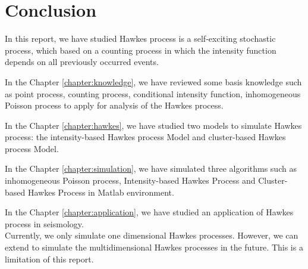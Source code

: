 \chapter{Conclusion}
\label{chapter:conclusion}
In this report, we have studied Hawkes process is a self-exciting stochastic process, which based on a counting process in which the intensity function depends on all previously occurred events. 

In the Chapter \ref{chapter:knowledge}, we have reviewed some basis knowledge such as point process, counting process, conditional intensity function, inhomogeneous Poisson process to apply for analysis of the Hawkes process.

In the Chapter \ref{chapter:hawkes}, we have studied two models to simulate Hawkes process: the intensity-based Hawkes process Model and cluster-based Hawkes process Model.

In the Chapter \ref{chapter:simulation}, we have simulated three algorithms such as inhomogeneous Poisson process, Intensity-based Hawkes Process and Cluster-based Hawkes Process in Matlab\textsuperscript{\textregistered} environment.

In the Chapter \ref{chapter:application}, we have studied an application of Hawkes process in seismology.\\
Currently, we only simulate one dimensional Hawkes processes. However, we can extend to simulate the multidimensional Hawkes processes in the future. This is a limitation of this report. 